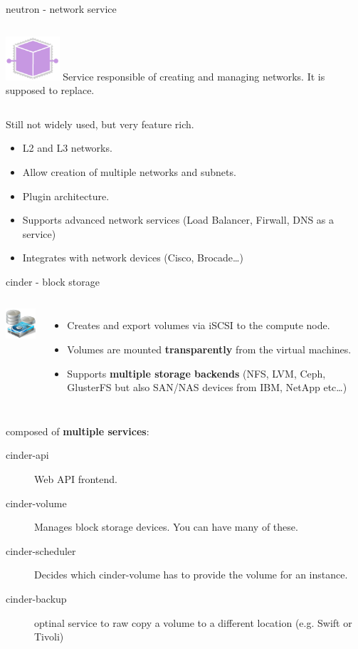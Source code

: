 \documentclass[english,serif,mathserif,usenames,dvipsnames]{beamer}
\begin{document}
\begin{frame}
  {neutron - network service}

  \begin{columns}
    \column{2cm}
    \includegraphics[width=2cm]{openstack-networking-icon.png}
    \column{8cm}
    Service responsible of creating and managing networks. It is
    supposed to replace.
  \end{columns}

  \+\+
  Still not widely used, but very feature rich.


  \begin{itemize}
  \item L2 and L3 networks.
  \item Allow creation of multiple networks and subnets.
  \item Plugin architecture.
  \item Supports advanced network services (Load Balancer, Firwall,
    DNS as a service)
  \item Integrates with network devices (Cisco, Brocade\ldots)
  \end{itemize}

\end{frame}


\begin{frame}
  {cinder - block storage}
  \begin{columns}
    \column{2cm}
    \includegraphics[width=2cm]{block_storage.png}
    \column{9cm}
    \begin{itemize}
    \item Creates and export volumes via iSCSI to the compute node.
    \item Volumes are mounted \textbf{transparently} from the virtual
      machines.
    \item Supports \textbf{multiple storage backends} (NFS, LVM, Ceph,
      GlusterFS but also SAN/NAS devices from IBM, NetApp etc\ldots )
    \end{itemize}
  \end{columns}

  \+
  composed of \textbf{multiple services}:
  \begin{description}
  \item[cinder-api] Web API frontend.
  \item[cinder-volume] Manages block storage devices. You can have
    many of these.
  \item[cinder-scheduler] Decides which cinder-volume has to provide
    the volume for an instance.
  \item[cinder-backup] optinal service to raw copy a volume to a
    different location (e.g. Swift or Tivoli)
  \end{description}
\end{frame}
\end{document}
